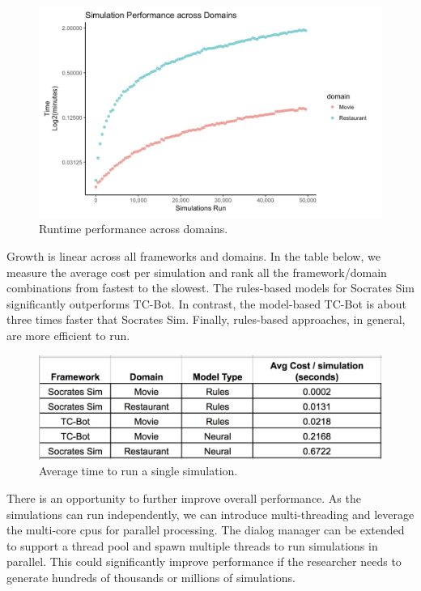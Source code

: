   \begin{figure}[h!]
 	\label{fig:perf_cd_test}
 	\includegraphics[width=\linewidth]{diagrams/domain_perf.jpeg}
 	\caption{ Runtime performance across domains.}
 \end{figure}

Growth is linear across all frameworks and domains. In the table below, we measure the average cost per simulation and rank all the framework/domain combinations from fastest to the slowest. The rules-based models for Socrates Sim significantly outperforms TC-Bot. In contrast, the model-based TC-Bot is about three times faster that Socrates Sim. Finally, rules-based approaches, in general, are more efficient to run. 

\begin{figure}[h!]
	\centering
	\includegraphics[width=\linewidth]{diagrams/avg_cost.jpeg}	
	\caption{ Average time to run a single simulation.}
	\label{fig:avg_cost}
\end{figure}

 There is an opportunity to further improve overall performance. As the simulations can run independently, we can introduce multi-threading and leverage the multi-core cpus for parallel processing. The dialog manager can be extended to support a thread pool and spawn multiple threads to run simulations in parallel. This could significantly improve performance if the researcher needs to generate hundreds of thousands or millions of simulations.  

